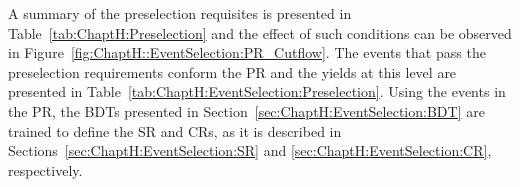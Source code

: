 


A summary of the preselection requisites is presented in
Table~\ref{tab:ChaptH:Preselection} and the effect of such conditions
can be observed in Figure~\ref{fig:ChaptH::EventSelection:PR_Cutflow}. 
The events that pass the preselection requirements
conform the  PR and the yields at this level are presented in Table~\ref{tab:ChaptH:EventSelection:Preselection}.
Using the events in the PR, the BDTs presented
in Section~\ref{sec:ChaptH:EventSelection:BDT} are trained to define the SR and CRs, 
as it is described in Sections~\ref{sec:ChaptH:EventSelection:SR} and \ref{sec:ChaptH:EventSelection:CR}, respectively. 


